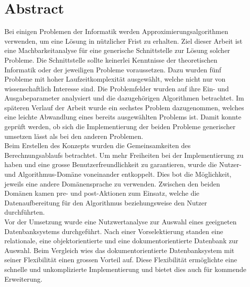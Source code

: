 %
%

\thispagestyle{empty}


\newpage
\thispagestyle{empty}
\chapter*{Abstract}\label{abstract}
Bei einigen Problemen der Informatik werden Approximierungsalgorithmen verwenden, um eine Lösung in nützlicher Frist zu erhalten. Ziel dieser Arbeit ist eine Machbarkeitanalyse für eine 
generische Schnittstelle zur Lösung solcher Probleme. Die Schnittstelle sollte keinerlei Kenntnisse der theoretischen Informatik oder der jeweiligen Probleme voraussetzen. Dazu wurden fünf 
Probleme mit hoher Laufzeitkomplexität ausgewählt, welche nicht nur von wissenschaftlich Interesse sind. Die Problemfelder wurden auf ihre Ein- und Ausgabeparameter analysiert und die 
dazugehörigen Algorithmen betrachtet. Im späteren Verlauf der Arbeit wurde ein sechstes Problem dazugenommen, welches eine leichte Abwandlung eines bereits ausgewählten Problems ist. 
Damit konnte geprüft werden, ob sich die Implementierung der beiden Probleme generischer umsetzen lässt als bei den anderen Problemen.\\

Beim Erstellen des Konzepts wurden die Gemeinsamkeiten des Berechnungsablaufs betrachtet. Um mehr Freiheiten bei der Implementierung zu haben und eine grosse Benutzerfreundlichkeit zu 
garantieren, wurde die Nutzer- und Algorithmus-Domäne voneinander entkoppelt. Dies bot die Möglichkeit, jeweils eine andere Domänensprache zu verwenden. Zwischen den beiden Domänen 
kamen pre- und post-Aktionen zum Einsatz, welche die Datenaufbereitung für den Algorithmus beziehungsweise den Nutzer durchführten.\\

Vor der Umsetzung wurde eine Nutzwertanalyse zur Auswahl eines geeigneten Datenbanksystems durchgeführt. Nach einer Vorselektierung standen eine relationale, eine objektorientierte und 
eine dokumentorientierte Datenbank zur Auswahl. Beim Vergleich wies das dokumentorientierte Datenbanksystem mit seiner Flexibilität einen grossen Vorteil auf. Diese Flexibilität ermöglichte eine 
schnelle und unkomplizierte Implementierung und bietet dies auch für kommende Erweiterung.\\

